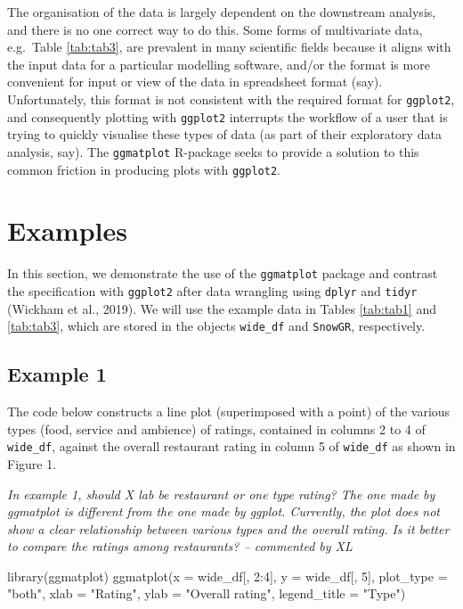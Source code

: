 \documentclass[10pt,a4paper,onecolumn]{article}
\newenvironment{Shaded}{\begin{snugshade}}{\end{snugshade}}
\newcommand{\AttributeTok}[1]{\textcolor[rgb]{0.77,0.63,0.00}{#1}}
\newcommand{\DecValTok}[1]{\textcolor[rgb]{0.00,0.00,0.81}{#1}}
\newcommand{\FunctionTok}[1]{\textcolor[rgb]{0.00,0.00,0.00}{#1}}
\newcommand{\NormalTok}[1]{#1}
\newcommand{\SpecialCharTok}[1]{\textcolor[rgb]{0.00,0.00,0.00}{#1}}
\newcommand{\StringTok}[1]{\textcolor[rgb]{0.31,0.60,0.02}{#1}}
\begin{document}
The organisation of the data is largely dependent on the downstream
analysis, and there is no one correct way to do this. Some forms of
multivariate data, e.g.~Table \ref{tab:tab3}, are prevalent in many
scientific fields because it aligns with the input data for a particular
modelling software, and/or the format is more convenient for input or
view of the data in spreadsheet format (say). Unfortunately, this format
is not consistent with the required format for \texttt{ggplot2}, and
consequently plotting with \texttt{ggplot2} interrupts the workflow of a
user that is trying to quickly visualise these types of data (as part of
their exploratory data analysis, say). The \texttt{ggmatplot} R-package
seeks to provide a solution to this common friction in producing plots
with \texttt{ggplot2}.

\hypertarget{examples}{%
\section{Examples}\label{examples}}

In this section, we demonstrate the use of the \texttt{ggmatplot}
package and contrast the specification with \texttt{ggplot2} after data
wrangling using \texttt{dplyr} and \texttt{tidyr} (Wickham et al.,
2019). We will use the example data in Tables \ref{tab:tab1} and
\ref{tab:tab3}, which are stored in the objects \texttt{wide\_df} and
\texttt{SnowGR}, respectively.

\hypertarget{example-1}{%
\subsection{Example 1}\label{example-1}}

The code below constructs a line plot (superimposed with a point) of the
various types (food, service and ambience) of ratings, contained in
columns 2 to 4 of \texttt{wide\_df}, against the overall restaurant
rating in column 5 of \texttt{wide\_df} as shown in Figure 1.

\emph{In example 1, should X lab be restaurant or one type rating? The
one made by ggmatplot is different from the one made by ggplot.
Currently, the plot does not show a clear relationship between various
types and the overall rating. Is it better to compare the ratings among
restaurants? -- commented by XL}

\begin{Shaded}
\begin{Highlighting}[]
\FunctionTok{library}\NormalTok{(ggmatplot)}
\FunctionTok{ggmatplot}\NormalTok{(}\AttributeTok{x =}\NormalTok{ wide\_df[, }\DecValTok{2}\SpecialCharTok{:}\DecValTok{4}\NormalTok{], }\AttributeTok{y =}\NormalTok{ wide\_df[, }\DecValTok{5}\NormalTok{], }\AttributeTok{plot\_type =} \StringTok{"both"}\NormalTok{,}
          \AttributeTok{xlab =} \StringTok{"Rating"}\NormalTok{,  }\AttributeTok{ylab =} \StringTok{"Overall rating"}\NormalTok{, }\AttributeTok{legend\_title =} \StringTok{"Type"}\NormalTok{) }
\end{Highlighting}
\end{Shaded}
\end{document}
